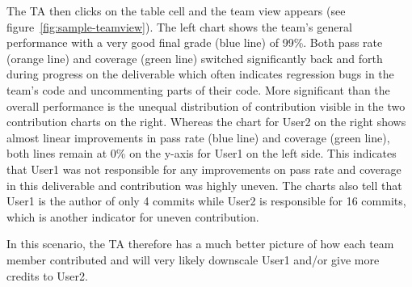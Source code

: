 \documentclass[../manifest.tex]{subfiles}
\begin{document}
The TA then clicks on the table cell and the team view appears (see figure~\ref{fig:sample-teamview}). The left chart shows the team's general performance with a very good final grade (blue line) of 99\%. Both pass rate (orange line) and coverage (green line) switched significantly back and forth during progress on the deliverable which often indicates regression bugs in the team's code and uncommenting parts of their code. More significant than the overall performance is the unequal distribution of contribution visible in the two contribution charts on the right. Whereas the chart for User2 on the right shows almost linear improvements in pass rate (blue line) and coverage (green line), both lines remain at 0\% on the y-axis for User1 on the left side. This indicates that User1 was not responsible for any improvements on pass rate and coverage in this deliverable and contribution was highly uneven. The charts also tell that User1 is the author of only 4 commits while User2 is responsible for 16 commits, which is another indicator for uneven contribution.

In this scenario, the TA therefore has a much better picture of how each team member contributed and will very likely downscale User1 and/or give more credits to User2.
\end{document}
